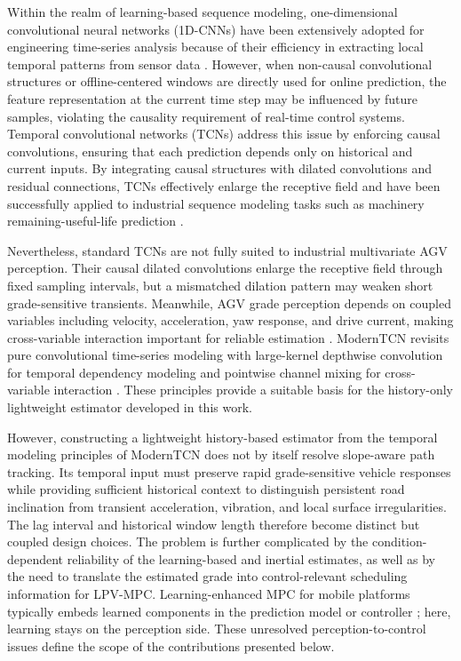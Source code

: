 \documentclass{ieeeaccess}
\newcommand{\citep}[1]{\cite{#1}}
\begin{document}
Within the realm of learning-based sequence modeling, one-dimensional convolutional neural networks (1D-CNNs) have been extensively adopted for engineering time-series analysis because of their efficiency in extracting local temporal patterns from sensor data \citep{Bueno2023Inception1DCNN}. However, when non-causal convolutional structures or offline-centered windows are directly used for online prediction, the feature representation at the current time step may be influenced by future samples, violating the causality requirement of real-time control systems. Temporal convolutional networks (TCNs) address this issue by enforcing causal convolutions, ensuring that each prediction depends only on historical and current inputs. By integrating causal structures with dilated convolutions and residual connections, TCNs effectively enlarge the receptive field and have been successfully applied to industrial sequence modeling tasks such as machinery remaining-useful-life prediction \citep{Bai2018TCN,Cao2021TCNRSA}.

Nevertheless, standard TCNs are not fully suited to industrial multivariate AGV perception. Their causal dilated convolutions enlarge the receptive field through fixed sampling intervals, but a mismatched dilation pattern may weaken short grade-sensitive transients. Meanwhile, AGV grade perception depends on coupled variables including velocity, acceleration, yaw response, and drive current, making cross-variable interaction important for reliable estimation \citep{Jin2023MTGODE}. ModernTCN revisits pure convolutional time-series modeling with large-kernel depthwise convolution for temporal dependency modeling and pointwise channel mixing for cross-variable interaction \citep{Luo2024ModernTCN}. These principles provide a suitable basis for the history-only lightweight estimator developed in this work.

However, constructing a lightweight history-based estimator from the temporal modeling principles of ModernTCN does not by itself resolve slope-aware path tracking. Its temporal input must preserve rapid grade-sensitive vehicle responses while providing sufficient historical context to distinguish persistent road inclination from transient acceleration, vibration, and local surface irregularities. The lag interval and historical window length therefore become distinct but coupled design choices. The problem is further complicated by the condition-dependent reliability of the learning-based and inertial estimates, as well as by the need to translate the estimated grade into control-relevant scheduling information for LPV-MPC. Learning-enhanced MPC for mobile platforms typically embeds learned components in the prediction model or controller \citep{Zhang2022LBMPCSurvey,Li2024PINNAGV}; here, learning stays on the perception side. These unresolved perception-to-control issues define the scope of the contributions presented below.
\end{document}
